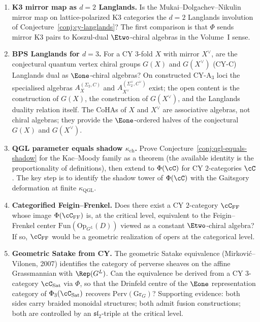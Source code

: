 \begin{enumerate}
 \item[(i)] \textbf{K3 mirror map as $d = 2$ Langlands.} Is the Mukai--Dolgachev--Nikulin mirror map on lattice-polarized K3 categories the $d = 2$ Langlands involution of Conjecture~\ref{conj:cy-langlands}? The first comparison is that $\Phi$ sends mirror K3 pairs to Koszul-dual $\Etwo$-chiral algebras in the Volume~I sense.
 \item[(ii)] \textbf{BPS Langlands for $d = 3$.} For a CY $3$-fold $X$ with mirror $X^\vee$, are the conjectural quantum vertex chiral groups $G(X)$ and $G(X^\vee)$ (CY-C) Langlands dual as $\Eone$-chiral algebras? On constructed CY-A$_3$ loci the specialised algebras \(A_X^{(\Sigma_2,C)}\) and \(A_{X^\vee}^{(\Sigma_2^\vee,C^\vee)}\) exist; the open content is the construction of \(G(X)\), the construction of \(G(X^\vee)\), and the Langlands duality relation itself. The CoHAs of $X$ and $X^\vee$ are associative algebras, not chiral algebras; they provide the $\Eone$-ordered halves of the conjectural $G(X)$ and $G(X^\vee)$.
 \item[(iii)] \textbf{QGL parameter equals shadow $\kappa_{\mathrm{ch}}$.} Prove Conjecture~\ref{conj:qgl-equals-shadow} for the Kac--Moody family as a theorem (the available identity is the proportionality of definitions), then extend to $\Phi(\cC)$ for CY $2$-categories $\cC$. The key step is to identify the shadow tower of $\Phi(\cC)$ with the Gaitsgory deformation at finite $\kappa_{\mathrm{QGL}}$.
 \item[(iv)] \textbf{Categorified Feigin--Frenkel.} Does there exist a CY $2$-category $\cC_{\mathrm{FF}}$ whose image $\Phi(\cC_{\mathrm{FF}})$ is, at the critical level, equivalent to the Feigin--Frenkel center $\mathrm{Fun}(\mathrm{Op}_{G^L}(D))$ viewed as a constant $\Etwo$-chiral algebra? If so, $\cC_{\mathrm{FF}}$ would be a geometric realization of opers at the categorical level.
 \item[(v)] \textbf{Geometric Satake from CY.} The geometric Satake equivalence (Mirkovi\'c--Vilonen, 2007) identifies the category of perverse sheaves on the affine Grassmannian with $\Rep(G^L)$. Can the equivalence be derived from a CY $3$-category $\cC_{\mathrm{Sat}}$ via $\Phi$, so that the Drinfeld centre of the $\Eone$ representation category of $\Phi_3(\cC_{\mathrm{Sat}})$ recovers $\mathrm{Perv}(\mathrm{Gr}_G)$? Supporting evidence: both sides carry braided monoidal structures; both admit fusion constructions; both are controlled by an $\mathfrak{sl}_2$-triple at the critical level.

\end{enumerate}
